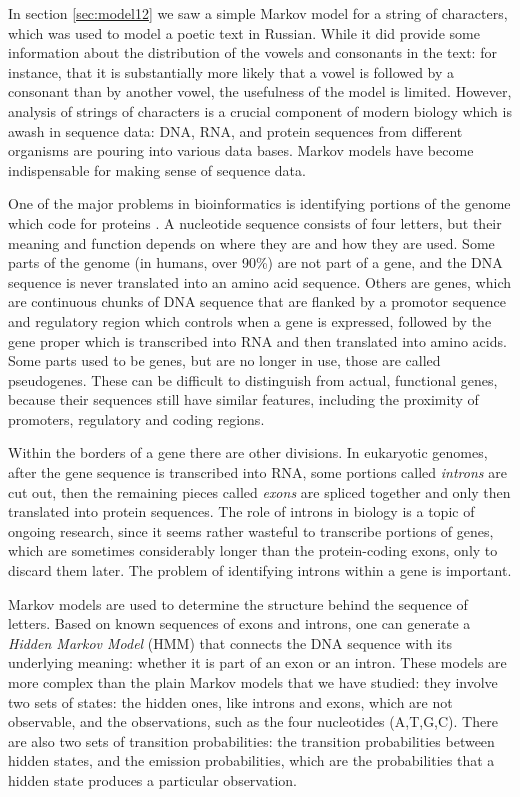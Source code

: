 \documentclass[
  letterpaper,
  DIV=11,
  numbers=noendperiod]{scrreprt}
\begin{document}
\label{sec:bio12}

In section \ref{sec:model12} we saw a simple Markov model for a string
of characters, which was used to model a poetic text in Russian. While
it did provide some information about the distribution of the vowels and
consonants in the text: for instance, that it is substantially more
likely that a vowel is followed by a consonant than by another vowel,
the usefulness of the model is limited. However, analysis of strings of
characters is a crucial component of modern biology which is awash in
sequence data: DNA, RNA, and protein sequences from different organisms
are pouring into various data bases. Markov models have become
indispensable for making sense of sequence data.

One of the major problems in bioinformatics is identifying portions of
the genome which code for proteins \cite{pevsner_bioinformatics_2009}. A
nucleotide sequence consists of four letters, but their meaning and
function depends on where they are and how they are used. Some parts of
the genome (in humans, over 90\%) are not part of a gene, and the DNA
sequence is never translated into an amino acid sequence. Others are
genes, which are continuous chunks of DNA sequence that are flanked by a
promotor sequence and regulatory region which controls when a gene is
expressed, followed by the gene proper which is transcribed into RNA and
then translated into amino acids. Some parts used to be genes, but are
no longer in use, those are called pseudogenes. These can be difficult
to distinguish from actual, functional genes, because their sequences
still have similar features, including the proximity of promoters,
regulatory and coding regions.

Within the borders of a gene there are other divisions. In eukaryotic
genomes, after the gene sequence is transcribed into RNA, some portions
called \emph{introns} are cut out, then the remaining pieces called
\emph{exons} are spliced together and only then translated into protein
sequences. The role of introns in biology is a topic of ongoing
research, since it seems rather wasteful to transcribe portions of
genes, which are sometimes considerably longer than the protein-coding
exons, only to discard them later. The problem of identifying introns
within a gene is important.

Markov models are used to determine the structure behind the sequence of
letters. Based on known sequences of exons and introns, one can generate
a \emph{Hidden Markov Model} (HMM) that connects the DNA sequence with
its underlying meaning: whether it is part of an exon or an intron.
These models are more complex than the plain Markov models that we have
studied: they involve two sets of states: the hidden ones, like introns
and exons, which are not observable, and the observations, such as the
four nucleotides (A,T,G,C). There are also two sets of transition
probabilities: the transition probabilities between hidden states, and
the emission probabilities, which are the probabilities that a hidden
state produces a particular observation.
\end{document}
